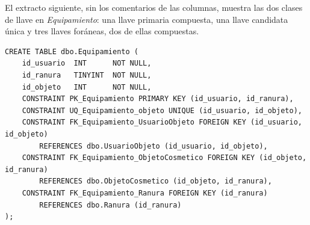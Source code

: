 El extracto siguiente, sin los comentarios de las columnas, muestra las dos clases de llave en \textit{Equipamiento}: una llave primaria compuesta, una llave candidata única y tres llaves foráneas, dos de ellas compuestas.

\begin{lstlisting}[style=sql, basicstyle=\ttfamily\footnotesize]
CREATE TABLE dbo.Equipamiento (
    id_usuario  INT      NOT NULL,
    id_ranura   TINYINT  NOT NULL,
    id_objeto   INT      NOT NULL,
    CONSTRAINT PK_Equipamiento PRIMARY KEY (id_usuario, id_ranura),
    CONSTRAINT UQ_Equipamiento_objeto UNIQUE (id_usuario, id_objeto),
    CONSTRAINT FK_Equipamiento_UsuarioObjeto FOREIGN KEY (id_usuario, id_objeto)
        REFERENCES dbo.UsuarioObjeto (id_usuario, id_objeto),
    CONSTRAINT FK_Equipamiento_ObjetoCosmetico FOREIGN KEY (id_objeto, id_ranura)
        REFERENCES dbo.ObjetoCosmetico (id_objeto, id_ranura),
    CONSTRAINT FK_Equipamiento_Ranura FOREIGN KEY (id_ranura)
        REFERENCES dbo.Ranura (id_ranura)
);
\end{lstlisting}
